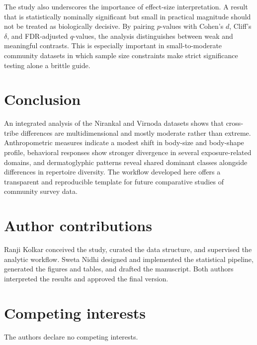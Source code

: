 \documentclass[11pt]{article}
\begin{document}
The study also underscores the importance of effect-size interpretation. A result that is statistically nominally significant but small in practical magnitude should not be treated as biologically decisive. By pairing $p$-values with Cohen's $d$, Cliff's $\delta$, and FDR-adjusted $q$-values, the analysis distinguishes between weak and meaningful contrasts. This is especially important in small-to-moderate community datasets in which sample size constraints make strict significance testing alone a brittle guide.

\section{Conclusion}
An integrated analysis of the Nirankal and Virnoda datasets shows that cross-tribe differences are multidimensional and mostly moderate rather than extreme. Anthropometric measures indicate a modest shift in body-size and body-shape profile, behavioral responses show stronger divergence in several exposure-related domains, and dermatoglyphic patterns reveal shared dominant classes alongside differences in repertoire diversity. The workflow developed here offers a transparent and reproducible template for future comparative studies of community survey data.

\section{Author contributions}
Ranji Kolkar conceived the study, curated the data structure, and supervised the analytic workflow. Sweta Nidhi designed and implemented the statistical pipeline, generated the figures and tables, and drafted the manuscript. Both authors interpreted the results and approved the final version.

\section{Competing interests}
The authors declare no competing interests.



\end{document}
